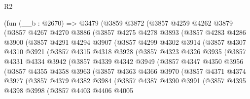 \begin{lexlean}{R2}
\begin{coremodule}
    (fun (__b : @2670) =>
    @3479
      (@3859
        @3872
        (@3857
          @4259
          @4262
          @3879
          (@3857
            @4267
            @4270
            @3886
            (@3857
              @4275
              @4278
              @3893
              (@3857
                @4283
                @4286
                @3900
                (@3857
                  @4291
                  @4294
                  @3907
                  (@3857
                    @4299
                    @4302
                    @3914
                    (@3857
                      @4307
                      @4310
                      @3921
                      (@3857
                        @4315
                        @4318
                        @3928
                        (@3857
                          @4323
                          @4326
                          @3935
                          (@3857
                            @4331
                            @4334
                            @3942
                            (@3857
                              @4339
                              @4342
                              @3949
                              (@3857
                                @4347
                                @4350
                                @3956
                                (@3857
                                  @4355
                                  @4358
                                  @3963
                                  (@3857
                                    @4363
                                    @4366
                                    @3970
                                    (@3857
                                      @4371
                                      @4374
                                      @3977
                                      (@3857
                                        @4379
                                        @4382
                                        @3984
                                        (@3857
                                          @4387
                                          @4390
                                          @3991
                                          (@3857
                                            @4395
                                            @4398
                                            @3998
                                            (@3857
                                              @4403
                                              @4406
                                              @4005

\end{coremodule}
\end{lexlean}
